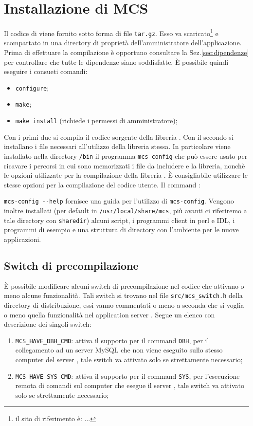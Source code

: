 \section{Installazione di MCS}
Il codice di \mcs viene fornito sotto forma di file
\verb|tar.gz|. Esso va scaricato\footnote{il sito di riferimento \`e:
...} e scompattato in una directory di propriet\`a dell'amministratore
dell'applicazione. Prima di effettuare la compilazione \`e opportuno
consultare la Sez.\ref{sec:dipendenze} per controllare che tutte le
dipendenze siano soddisfatte. \`E possibile quindi eseguire i consueti
comandi:
\begin{itemize}
\item \verb|configure|;
\item \verb|make|;
\item \verb|make install| (richiede i permessi di amministratore);
\end{itemize}
%
Con i primi due si compila il codice sorgente della libreria
\mcs. Con il secondo si installano i file necessari all'utilizzo
della libreria stessa. In particolare viene installato nella directory
\verb|/bin| il programma \verb|mcs-config| che pu\`o essere usato per
ricavare i percorsi in cui sono memorizzati i file da includere e la
libreria, nonch\`e le opzioni utilizzate per la compilazione della
libreria \mcs. \`E consigliabile utilizzare le stesse opzioni
per la compilazione del codice utente. Il command :

\bigskip

\verb|mcs-config --help|
\bigskip\newline
%
fornisce una guida per l'utilizzo di \verb|mcs-config|. Vengono
inoltre installati (per default in \verb|/usr/local/share/mcs|, pi\`u
avanti ci riferiremo a tale directory con \verb|sharedir|) alcuni
script, i programmi client in perl e IDL, i programmi di esempio e una
struttura di directory con l'ambiente per le nuove applicazioni.

\subsection{Switch di precompilazione}\label{ssec:switch}
\`E possibile modificare alcuni switch di precompilazione nel codice
che attivano o meno alcune funzionalit\`a. Tali switch si trovano nel
file \verb|src/mcs_switch.h| della directory di distribuzione, essi
vanno commentati o meno a seconda che si voglia o meno quella
funzionalit\`a nel application server \mcs. Segue un elenco con
descrizione dei singoli switch:
\begin{enumerate}
\item \verb|MCS_HAVE_DBH_CMD|: attiva il supporto per il command
  \verb|DBH|, per il collegamento ad un server MySQL che non viene
  eseguito sullo stesso computer del server \mcs, tale switch va
  attivato solo se strettamente necessario;
\item \verb|MCS_HAVE_SYS_CMD|: attiva il supporto per il
  command \verb|SYS|, per l'esecuzione remota di comandi sul computer
  che esegue il server \mcs, tale switch va attivato solo se
  strettamente necessario;
\end{enumerate}


